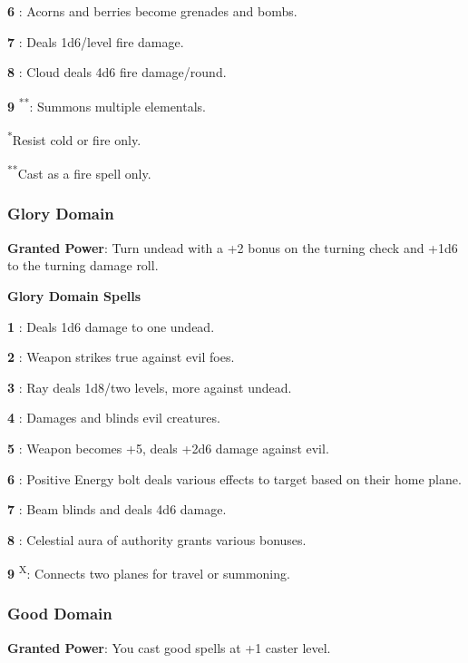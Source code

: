 \textbf{6} : Acorns and berries become grenades and bombs.

\textbf{7} : Deals 1d6/level fire damage.

\textbf{8} : Cloud deals 4d6 fire damage/round.

\textbf{9} \textsuperscript{*}\textsuperscript{*}: Summons multiple elementals.

\textsuperscript{*}Resist cold or fire only.

\textsuperscript{*}\textsuperscript{*}Cast as a fire spell only.

\subsubsection{Glory Domain}

\textbf{Granted Power}: Turn undead with a +2 bonus on the turning check and +1d6 to the turning damage roll.

\textbf{Glory Domain Spells}

\textbf{1} : Deals 1d6 damage to one undead.

\textbf{2} : Weapon strikes true against evil foes.

\textbf{3} : Ray deals 1d8/two levels, more against undead.

\textbf{4} : Damages and blinds evil creatures.

\textbf{5} : Weapon becomes +5, deals +2d6 damage against evil.

\textbf{6} : Positive Energy bolt deals various effects to target based on their home plane.

\textbf{7} : Beam blinds and deals 4d6 damage.

\textbf{8} : Celestial aura of authority grants various bonuses.

\textbf{9} \textsuperscript{X}: Connects two planes for travel or summoning.

\subsubsection{Good Domain}

\textbf{Granted Power}: You cast good spells at +1 caster level.

